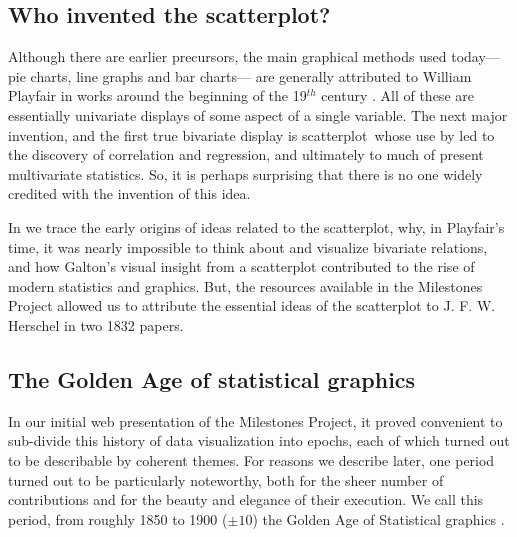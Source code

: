 \documentclass[11pt]{article}
\newcommand{\Cent}[1]{#1$^{th}$ century}
\newcommand*{\scat}{scatterplot}
\begin{document}
\subsection{Who invented the scatterplot?}
Although there are earlier precursors, the main graphical methods used today---
pie charts, line graphs and bar charts--- are generally attributed to
William Playfair in works around the beginning of the \Cent{19}
\citep{Playfair:1786,Playfair:1801}. All of these are essentially univariate
displays of some aspect of a single variable. The next major invention,
and the first true bivariate display is \scat\, whose use by
\citet{Galton:1886} led to the discovery of
correlation and regression, and ultimately to much of present multivariate
statistics. So, it is perhaps surprising that there is no one widely
credited with the invention of this idea.

In \citet{FriendlyDenis:05:scat} we trace the early origins of ideas related to
the scatterplot, why, in Playfair's time, it was nearly impossible to think about
and visualize bivariate relations, and how Galton's visual insight from
a scatterplot contributed to the rise of modern statistics and graphics.
But, the resources available in the Milestones Project allowed us to attribute
the essential ideas of the scatterplot to J. F. W. Herschel in two 1832 papers.

\subsection{The Golden Age of statistical graphics}

In our initial web presentation of the Milestones Project, it proved convenient
to sub-divide this history of data visualization into epochs, each of which turned
out to be describable by coherent themes.  For reasons we describe later, one
period turned out to be particularly noteworthy, both for the sheer number of
contributions and for the beauty and elegance of their execution.
We call this period, from roughly 1850 to 1900 ($\pm 10$) the Golden Age of
Statistical graphics \citep{Friendly:2008:golden}.
\end{document}
